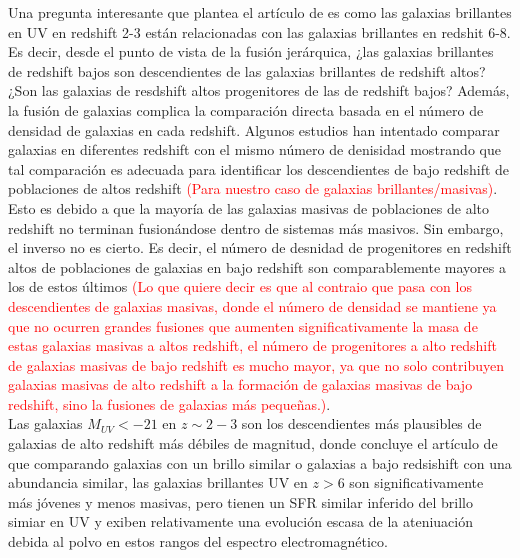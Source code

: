 Una pregunta interesante que plantea el artículo de \cite{finkelstein2015increasing} es como las galaxias brillantes en UV en redshift 2-3 están relacionadas con las galaxias brillantes en redshit 6-8. Es decir, desde el punto de vista de la fusión jerárquica, ¿las galaxias brillantes de redshift bajos son descendientes de las galaxias brillantes de redshift altos? ¿Son las galaxias de resdshift altos progenitores de las de redshift bajos? Además, la fusión de galaxias complica la comparación directa basada en el número de densidad de galaxias en cada redshift. Algunos estudios han intentado comparar galaxias en diferentes redshift con el mismo número de denisidad mostrando que tal comparación es adecuada para identificar los descendientes de bajo redshift de poblaciones de altos redshift \textcolor{red}{(Para nuestro caso de galaxias brillantes/masivas)}. Esto es debido a que la mayoría de las galaxias masivas de poblaciones de alto redshift no terminan fusionándose dentro de sistemas más masivos. Sin embargo, el inverso no es cierto. Es decir, el número de desnidad de progenitores en redshift altos de poblaciones de galaxias en bajo redshift son comparablemente mayores a los de estos últimos \textcolor{red}{(Lo que quiere decir es que al contraio que pasa con los descendientes de galaxias masivas, donde el número de densidad se mantiene ya que no ocurren grandes fusiones que aumenten significativamente la masa de estas galaxias masivas a altos redshift, el número de progenitores a alto redshift de galaxias masivas de bajo redshift es mucho mayor, ya que no solo contribuyen galaxias masivas de alto redshift a la formación de galaxias masivas de bajo redshift, sino la fusiones de galaxias más pequeñas.)}.\\


Las galaxias $M_{UV}<-21$ en $z\sim 2-3$ son los descendientes más plausibles de galaxias de alto redshift más débiles de magnitud, donde concluye el artículo de \cite{finkelstein2015increasing} que comparando galaxias con un brillo similar o galaxias a bajo redsishift con una abundancia similar, las galaxias brillantes UV en $z>6$ son significativamente más jóvenes y menos masivas, pero tienen un SFR similar inferido del brillo simiar en UV y exiben relativamente una evolución escasa de la ateniuación debida al polvo en estos rangos del espectro electromagnético.\\

